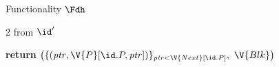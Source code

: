 \begin{interface}[nofloat]{Functionality $\Fdh$ \\
}
{\begin{multicols}{2}
 \quad from $\id'$
\begin{algorithmic}[1]
\algcont
\State \textbf{return} $\bigl(\{(\mathit{ptr}, \V{P}[\id.P, \mathit{ptr}])\}_{\mathit{ptr} < \V{Next}[\id.P]},\ \V{Blk}\bigr)$ \label{ln:dhleak}
\algsave
\end{algorithmic}
\end{multicols}}
\end{interface}
